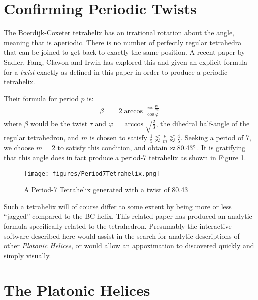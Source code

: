 \documentclass[11pt]{article}
\begin{document}
{\section{Confirming Periodic Twists}

The Boerdijk-Coxeter tetrahelix has an irrational rotation about the angle,
meaning that is aperiodic.
There is no number of perfectly regular tetrahedra that can be joined to get back to exactly
the same position.
A recent paper by Sadler, Fang, Clawon and Irwin\cite{sadler2019periodic} has explored this
and given an explicit formula for a {\em twist} exactly as defined in this
paper in order to produce a periodic tetrahelix.

Their formula for period $p$ is:
\begin{align}
  \beta =& 2 \arccos{\frac{\cos{\frac{p\pi}{m}}}{\cos{\varphi}}}
\end{align}
where $\beta$ would be the twist $\tau$ and $\varphi = \arccos{\sqrt{\frac{2}{3}}}$,
the dihedral half-angle of the regular tetrahedron, and $m$ is chosen to
satisfy $\frac{1}{5} \lessapprox \frac{p}{m} \lessapprox \frac{4}{5}$.
Seeking a period of 7, we choose $m = 2$ to satisfy this condition, and
obtain $\approx 80.43 \degree$. It is gratifying that this angle does
in fact produce a period-7 tetrahelix as shown in Figure \ref{fig:periodseven}.

\begin{figure}
     \centering
     \texttt{[image: figures/Period7Tetrahelix.png]}
     \caption{ A Period-7 Tetrahelix generated with a twist of 80.43\degree}
  \label{fig:periodseven}
\end{figure}

Such a tetrahelix will
of course differ to some extent by being more or less ``jagged'' compared to the
BC helix. This related paper\cite{sadler2019periodic} has produced an analytic
formula specifically related to the tetrahedron. Presumably the interactive
software described here would assist in the search for analytic descriptions
of other {\em Platonic Helices}, or would allow an appoximation
to discovered quickly and simply visually.


\section{The Platonic Helices}

\label{sec:platonic}

}
\end{document}
